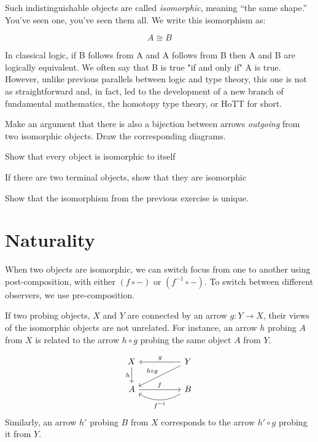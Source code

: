 \documentclass[DaoFP]{subfiles}
\begin{document}
Such indistinguishable objects are called \emph{isomorphic}, meaning ``the same shape.'' You've seen one, you've seen them all. We write this isomorphism as:

\[A \cong B\]

In classical logic, if B follows from A and A follows from B then A and B are logically equivalent. We often say that B is true "if and only if" A is true. However, unlike previous parallels between logic and type theory, this one is not as straightforward and, in fact, led to the development of a new branch of fundamental mathematics, the homotopy type theory, or HoTT for short.

\begin{exercise}
Make an argument that there is also a bijection between arrows \emph{outgoing} from two isomorphic objects. Draw the corresponding diagrams.
\end{exercise}


\begin{exercise}
Show that every object is isomorphic to itself
\end{exercise}

\begin{exercise}
If there are two terminal objects, show that they are isomorphic
\end{exercise}

\begin{exercise}
Show that the isomorphism from the previous exercise is unique.
\end{exercise}

\section{Naturality}

When two objects are isomorphic, we can switch focus from one to another using post-composition, with either $(f \circ -)$ or $(f^{-1} \circ -)$. To switch between different observers, we use pre-composition. 



If two probing objects, $X$ and $Y$ are connected by an arrow $g \colon Y \to X$, their views of the isomorphic objects are not unrelated. For instance, an arrow $h$ probing $A$ from $X$ is related to the arrow $h\circ g$ probing the same object $A$ from $Y$. 

\[
 \begin{tikzcd}
 X
 \arrow[d, "h"']
 && Y
 \arrow[ll, "g"']
  \arrow[dll, "h \circ g"']
 \\
 A
 \arrow[rr, "f"]
  && B
 \arrow[ll, bend left,  "f^{-1}"]
 \end{tikzcd}
\]
Similarly, an arrow $h'$ probing $B$ from $X$ corresponds to the arrow $h' \circ g$ probing it from $Y$.
\end{document}
